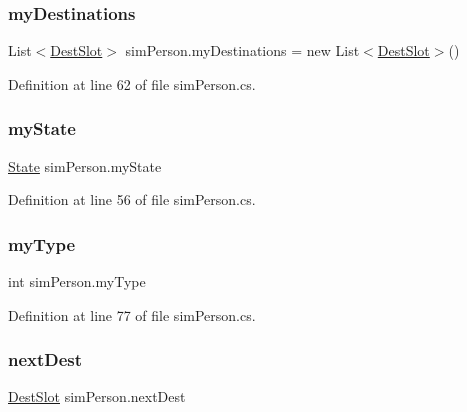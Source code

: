 \subsubsection{\texorpdfstring{my\+Destinations}{myDestinations}}
{\footnotesize\ttfamily List$<$\hyperlink{classsim_person_1_1_dest_slot}{Dest\+Slot}$>$ sim\+Person.\+my\+Destinations = new List$<$\hyperlink{classsim_person_1_1_dest_slot}{Dest\+Slot}$>$()}



Definition at line 62 of file sim\+Person.\+cs.

\hypertarget{classsim_person_aae85299b3299888345288c53bf991626}{}\label{classsim_person_aae85299b3299888345288c53bf991626} 
\subsubsection{\texorpdfstring{my\+State}{myState}}
{\footnotesize\ttfamily \hyperlink{classsim_person_a2e742c09e6786146fe250d0066fe78e9}{State} sim\+Person.\+my\+State}



Definition at line 56 of file sim\+Person.\+cs.

\hypertarget{classsim_person_aefacfa94adcf92832728769bb58895bc}{}\label{classsim_person_aefacfa94adcf92832728769bb58895bc} 
\subsubsection{\texorpdfstring{my\+Type}{myType}}
{\footnotesize\ttfamily int sim\+Person.\+my\+Type}



Definition at line 77 of file sim\+Person.\+cs.

\hypertarget{classsim_person_ae3bcceb05ae974887c5f6f68951f5dcc}{}\label{classsim_person_ae3bcceb05ae974887c5f6f68951f5dcc} 
\subsubsection{\texorpdfstring{next\+Dest}{nextDest}}
{\footnotesize\ttfamily \hyperlink{classsim_person_1_1_dest_slot}{Dest\+Slot} sim\+Person.\+next\+Dest}



